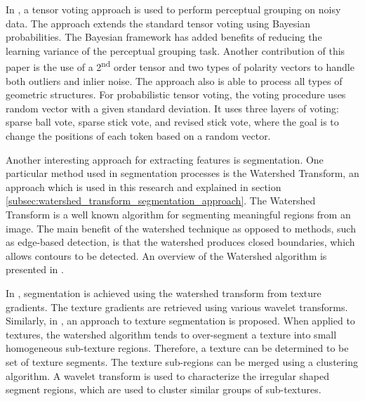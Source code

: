 In \cite{Probabilistic-tensor-voting-robust-perceptual-grouping}, a tensor voting approach is used to perform perceptual grouping on noisy data. The approach extends the standard tensor voting using Bayesian probabilities. The Bayesian framework has added benefits of	reducing the learning variance of the perceptual grouping task. Another	contribution of this paper is the use of a 2\textsuperscript{nd} order tensor and two	types of polarity vectors to handle both outliers and inlier noise. The approach also is able to process all types of geometric structures. For probabilistic tensor voting, the voting procedure uses random vector with a given standard deviation. It uses three layers of voting:	sparse ball vote, sparse stick vote, and revised stick vote, where the goal is to change the positions of each token based on a random vector.

Another interesting approach for extracting features is segmentation. One particular method used in segmentation processes is the Watershed Transform, an approach which is used in this research and explained in section \ref{subsec:watershed_transform_segmentation_approach}. The Watershed Transform is a well known algorithm for segmenting meaningful regions from an image. The main benefit of the watershed technique as opposed to methods, such as edge-based detection, is that the watershed produces closed boundaries, which allows contours to be detected. An overview of the Watershed algorithm	is presented in \cite{Watershed-transform-definition-algorithms-parallelization-strategies}.

In \cite{Image_segmentation_using_texture_gradient_based_watershed_transform}, segmentation is achieved using the watershed transform from texture gradients. The texture gradients are retrieved using various wavelet transforms. Similarly, in \cite{Watershed-based-textural-image-segmentation}, an approach to texture segmentation is proposed. When applied to textures,	the watershed algorithm tends to over-segment a texture into small homogeneous sub-texture regions. Therefore, a texture can be determined	to be set of texture segments. The texture sub-regions can be merged using a clustering algorithm. A wavelet transform is used to characterize the irregular shaped segment regions, which are used to cluster similar	groups of sub-textures.

